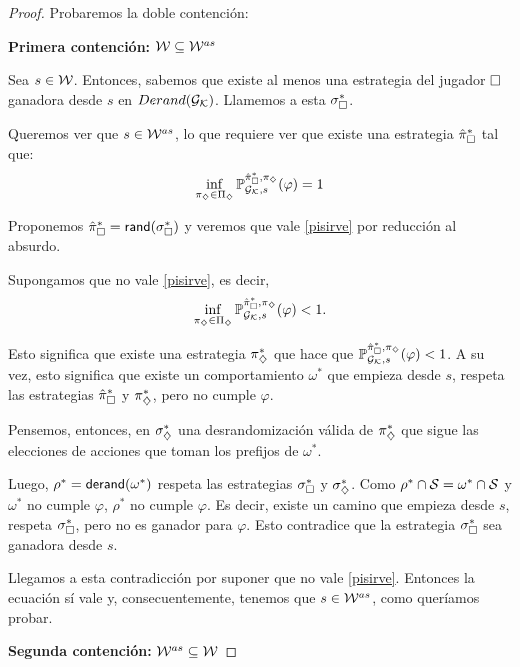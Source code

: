\begin{proof}
	Probaremos la doble contención:

	\textbf{Primera contención: } $\mathcal{W} \subseteq \mathcal{W}^{as}$

	Sea $s \in \mathcal{W}$. Entonces, sabemos que existe al menos una estrategia del
	jugador $\square$ ganadora desde $s$ en $Derand(\mathcal{G}_{\mathcal{K}})$. Llamemos a esta
	$\sigma_\square^{*}$.

	Queremos ver que $s \in \mathcal{W}^{as}$, lo que requiere ver que existe una estrategia
	$\hat{\pi}_{\square}^{*}$ tal que:
	\begin{equation}
		\label{pisirve}
		\inf_{\pi_\diamondsuit \in \Pi_\diamondsuit} \mathbb{P}_{\mathcal{G}_{\mathcal{K}},s}^{\hat{\pi}_{\square}^{*}, \pi_\diamondsuit}(\varphi) = 1
	\end{equation}

	Proponemos $\hat{\pi}_{\square}^{*} = \textsf{rand}(\sigma_\square^*)$ y veremos que vale \ref{pisirve}
	por reducción al absurdo.

	Supongamos que no vale \ref{pisirve}, es decir,
	\begin{equation}
		\inf_{\pi_\diamondsuit \in \Pi_\diamondsuit} \mathbb{P}_{\mathcal{G}_{\mathcal{K}}, s}^{\hat{\pi}_{\square}^{*}, \pi_\diamondsuit} (\varphi) < 1.
	\end{equation}

	Esto significa que existe una estrategia $\pi_\diamondsuit^*$ que hace que $\mathbb{P}_{\mathcal{G}_{\mathcal{K}},
			s}^{\hat{\pi}_{\square}^{*}, \pi_\diamondsuit} (\varphi) < 1$. A su vez, esto significa que existe un
	comportamiento $\omega^*$ que empieza desde $s$, respeta las estrategias
	$\hat{\pi}_{\square}^{*}$ y $\pi_\diamondsuit^*$, pero no cumple $\varphi$.

	Pensemos, entonces, en $\sigma_\diamondsuit^*$ una desrandomización válida de
	$\pi_\diamondsuit^*$ que sigue las elecciones de acciones que toman los prefijos de
	$\omega^*$.

	Luego, $\rho^* = \textsf{derand}(\omega^*)$ respeta las estrategias $\sigma_\square^*$ y
	$\sigma_\diamondsuit^*$. Como $\rho^* \cap \mathcal{S} = \omega^* \cap \mathcal{S}$ y $\omega^*$ no
	cumple $\varphi$, $\rho^*$ no cumple $\varphi$. Es decir, existe un camino que
	empieza desde $s$, respeta $\sigma_\square^*$, pero no es ganador para $\varphi$.
	Esto contradice que la estrategia $\sigma_\square^*$ sea ganadora desde $s$.

	Llegamos a esta contradicción por suponer que no vale \ref{pisirve}. Entonces
	la ecuación sí vale y, consecuentemente, tenemos que $s \in \mathcal{W}^{as}$, como
	queríamos probar.

	\textbf{Segunda contención: } $\mathcal{W}^{as} \subseteq \mathcal{W}$


\end{proof}
